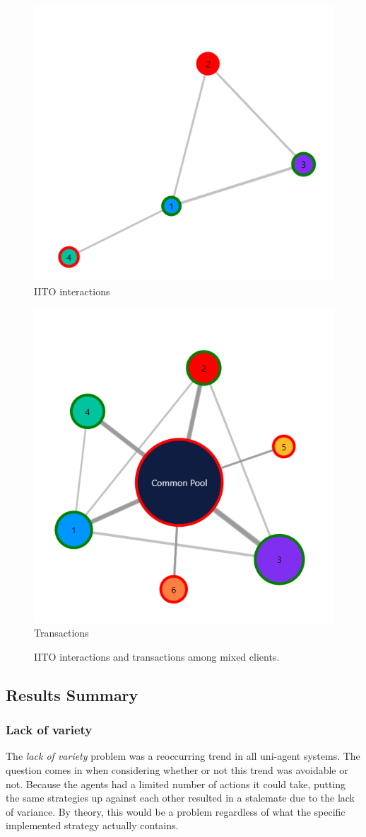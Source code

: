 \begin{figure}[H]
\centering
\begin{minipage}{.5\textwidth}
  \centering
  \includegraphics[width=.45\linewidth]{12_team4_agentdesign/images/IITOMA.png}
  IITO interactions
\end{minipage}%
\begin{minipage}{.5\textwidth}
  \centering
  \includegraphics[width=.45\linewidth]{12_team4_agentdesign/images/TransactionsMA.png}
  Transactions
\end{minipage}
  \label{fig:IITOTransMA}
  \caption{IITO interactions and transactions among mixed clients.}
\end{figure}


\subsection{Results Summary} \label{ResultSummary}
\subsubsection{Lack of variety}
The \emph{lack of variety} problem was a reoccurring trend in all uni-agent systems. The question comes in when considering whether or not this trend was avoidable or not. Because the agents had a limited number of actions it could take, putting the same strategies up against each other resulted in a stalemate due to the lack of variance. By theory, this would be a problem regardless of what the specific implemented strategy actually contains.

